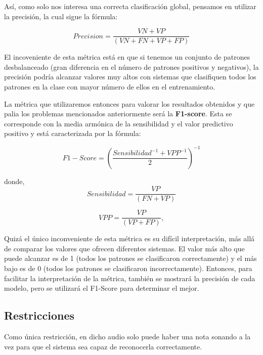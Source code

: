 \documentclass[12pt]{article}
\begin{document}
\bigskip
Así, como solo nos interesa una correcta clasificación global, pensamos en utilizar la precisión, la cual sigue la fórmula:

\begin{equation}
	Precision = \frac{VN + VP}{(VN + FN + VP + FP)}
\end{equation}

\smallskip
El incoveniente de esta métrica está en que si tenemos un conjunto de patrones desbalanceado (gran diferencia en el número de
patrones positivos y negativos), la precisión podría alcanzar valores muy altos con sistemas que clasifiquen todos los patrones en la clase con mayor número de ellos
en el entrenamiento.

\bigskip
La métrica que utilizaremos entonces para valorar los resultados obtenidos y que palia los problemas
mencionados anteriormente será la \textbf{F1-score}. Esta se corresponde con la media armónica de la sensibilidad y el
valor predictivo positivo y está caracterizada por la fórmula: 

\begin{equation}
	F1-Score = \left(\frac{Sensibilidad^{-1} + VPP^{-1}}{2}\right)^{-1}
\end{equation}

donde, 
\begin{equation}
	Sensibilidad = \frac{VP}{(FN + VP)}
\end{equation}

\begin{equation}
	VPP = \frac{VP}{(VP + FP)}, 
\end{equation}

\smallskip
Quizá el único inconveniente de esta métrica es su difícil interpretación, más allá de comparar los valores que ofrecen diferentes sistemas.
El valor más alto que puede alcanzar es de 1 (todos los patrones se clasificaron correctamente) y el más bajo es de 0 (todos los patrones se clasificaron
incorrectamente). Entonces, para facilitar la interpretación de la métrica, también se mostrará la precisión de cada modelo, pero se utilizará
el F1-Score para determinar el mejor.

\newpage
\subsection{Restricciones}
\bigskip
Como única restricción, en dicho audio solo puede haber una nota sonando a la vez para que el sistema sea capaz de reconocerla correctamente.
\end{document}
